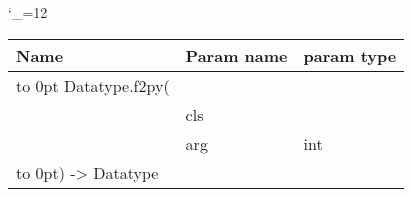 \begingroup \catcode`\_=12 \tt
\begin{tabular}{lll}
\toprule
\textrm{Name}&\textrm{Param name}&\textrm{param type}\\
\midrule
\hbox to 0pt {Datatype.f2py(\hss}\\
& cls\\
& arg & int\\
\hbox to 0pt{) -> Datatype\hss}\\
\bottomrule
\end{tabular}
\endgroup
